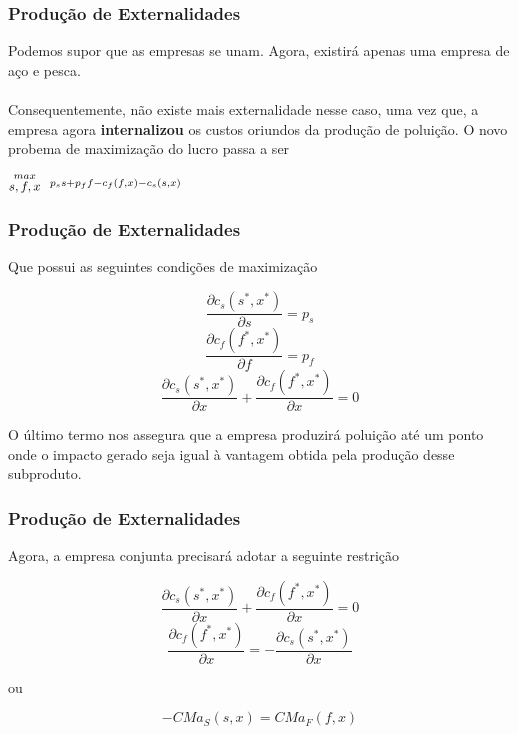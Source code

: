 \documentclass{beamer}[10]
\begin{document}
\begin{frame}
	\frametitle{Produção de Externalidades}	

	Podemos supor que as empresas se unam. Agora, existirá apenas uma empresa de aço e pesca.
	\\~\\
	Consequentemente, não existe mais externalidade nesse caso, uma vez que, a empresa agora \textbf{internalizou} os custos oriundos da produção de poluição. O novo probema de maximização do lucro passa a ser

	\begin{center}
		\LARGE $ \stackrel{max}{\text{\small $s,f,x$}} \ \ %
		\stackrel{p_s s + p_f f - c_f(f,x) - c_s(s,x)}{\ } $ %
	\end{center}

\end{frame}

\begin{frame}
	\frametitle{Produção de Externalidades}

	Que possui as seguintes condições de maximização

	$$ \frac{\partial c_s(s^*,x^*)}{\partial s} = p_s $$
	$$ \frac{\partial c_f(f^*,x^*)}{\partial f} = p_f $$
	$$ \frac{\partial c_s(s^*,x^*)}{\partial x} + \frac{\partial c_f(f^*,x^*)}{\partial x}= 0 $$

	O último termo nos assegura que a empresa produzirá poluição até um ponto onde o impacto gerado seja igual à vantagem obtida pela produção desse subproduto.

\end{frame}

\begin{frame}
	\frametitle{Produção de Externalidades}

	Agora, a empresa conjunta precisará adotar a seguinte restrição

	$$ \frac{\partial c_s(s^*,x^*)}{\partial x} + \frac{\partial c_f(f^*,x^*)}{\partial x}= 0 $$
	$$\frac{\partial c_f(f^*,x^*)}{\partial x} = - \frac{\partial c_s(s^*,x^*)}{\partial x} $$

	\begin{center}
		ou
	\end{center}

	$$ - CMa_S(s,x) = CMa_F(f,x) $$

\end{frame}
\end{document}
